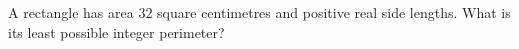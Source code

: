 A rectangle has area $ 32 $ square centimetres and positive real side lengths. What is its least possible integer perimeter?
